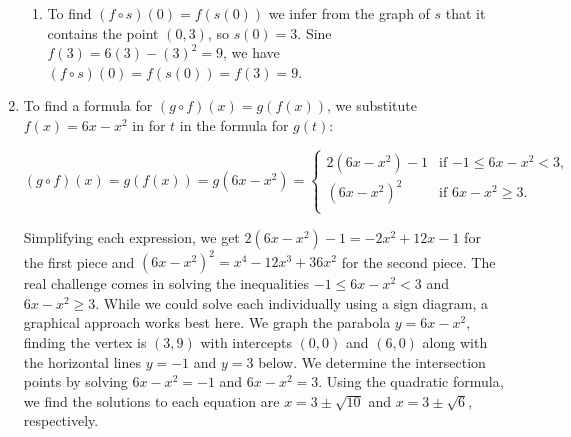 \documentclass{ximera}
\begin{document}
\begin{example}
\begin{enumerate}
\begin{enumerate}
\item  To find $(f \circ s)(0) = f(s(0))$ we infer from the graph of $s$ that it contains the point $(0,3)$, so $s(0) = 3$. Sine $f(3) = 6(3) - (3)^2 = 9$, we have $(f \circ s)(0) = f(s(0)) = f(3) = 9$.


\end{enumerate}

\item  To find a formula for $(g \circ f)(x) = g(f(x))$, we substitute $f(x) = 6x-x^2$ in for $t$ in the formula for $g(t)$: 

\[ (g \circ f)(x) = g(f(x)) = g(6x-x^2) =   \begin{cases}   2(6x-x^2) -1 &  \text{if $-1 \leq 6x-x^2  < 3$, } \\  (6x-x^2)^2  & \text{if $6x-x^2 \geq 3$.} \\ \end{cases}\]

Simplifying each expression, we get  $ 2(6x-x^2) -1 = -2x^2+12x-1$  for the first piece and $(6x-x^2)^2 = x^4 - 12x^3 +36x^2$ for the second piece.  The real challenge comes in  solving the inequalities   $-1 \leq 6x-x^2  < 3$ and $6x-x^2 \geq 3$.  While we could solve each individually using a sign diagram, a graphical approach works best here.  We graph the parabola $y = 6x-x^2$, finding the vertex is $(3, 9)$ with intercepts $(0,0)$ and $(6,0)$ along with the horizontal lines $y = -1$ and $y=3$ below.  We determine the intersection points by solving $6x-x^2=-1$ and $6x-x^2=3$.  Using the quadratic formula, we find the solutions to each equation are $x = 3 \pm \sqrt{10}$ and $x = 3 \pm \sqrt{6}$, respectively. 

\begin{center}

% 


\end{center}
\end{enumerate}
\end{example}
\end{document}
